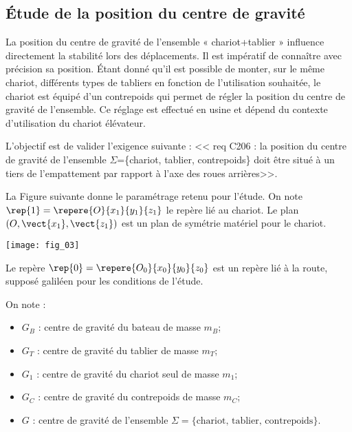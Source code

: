 \begin{multicols}{2}
\subsection*{Étude de la position du centre de gravité}
\ifprof
\else
La position du centre de gravité de l’ensemble « chariot+tablier » influence directement la stabilité lors des déplacements. Il est impératif de connaître avec précision sa position.
Étant donné qu’il est possible de monter, sur le même chariot, différents types de tabliers en fonction de l’utilisation souhaitée, le chariot est équipé d’un contrepoids qui permet de régler la position du centre de gravité de l’ensemble. Ce réglage est effectué en usine et dépend du contexte d’utilisation du chariot élévateur.
\fi

\begin{obj}
L'objectif est de valider l'exigence suivante : << req C206 : la position du centre de gravité de l'ensemble $\Sigma$=\{chariot, tablier, contrepoids\} doit être situé à un tiers de l'empattement par rapport à l'axe des roues arrières>>. 
\end{obj}

\ifprof
\else
La Figure suivante donne le paramétrage retenu pour l’étude. On note $\rep{1}=\repere{O}{x_1}{y_1}{z_1}$ le repère lié au chariot. Le plan $\left(O,\vect{x_1},\vect{z_1} \right)$ est un plan de symétrie matériel pour le chariot.

\begin{center}
\texttt{[image: fig\_03]}
\end{center}

Le repère  $\rep{0}=\repere{O_0}{x_0}{y_0}{z_0}$ est un repère lié à la route, supposé galiléen pour les conditions de l’étude.

On note : 
\begin{itemize}
\item $G_B$ : centre de gravité du bateau de masse $m_B$;
\item $G_T$ : centre de gravité du tablier de masse $m_T$;
\item $G_1$ : centre de gravité du chariot seul de masse $m_1$;
\item $G_C$ : centre de gravité du contrepoids de masse $m_C$;
\item $G$ : centre de gravité de l'ensemble $\Sigma =  \{\text{chariot, tablier, contrepoids}\}$.
\end{itemize}


\end{multicols}
